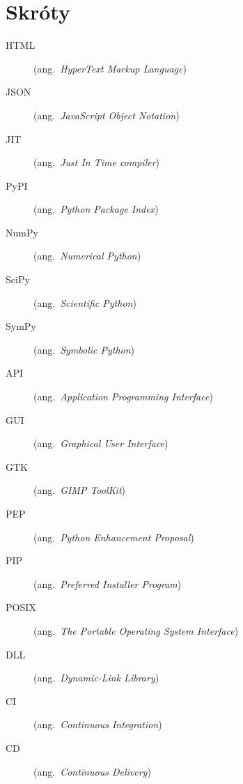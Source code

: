 \chapter*{Skróty}\mbox{}
\label{sec:skroty}
\noindent
\begin{description}
  \item [HTML]    (ang.\ \emph{HyperText Markup Language})
  \item [JSON]    (ang.\ \emph{JavaScript Object Notation})
  \item [JIT]     (ang.\ \emph{Just In Time compiler})
  \item [PyPI]    (ang.\ \emph{Python Package Index})
  \item [NumPy]   (ang.\ \emph{Numerical Python})
  \item [SciPy]   (ang.\ \emph{Scientific Python})
  \item [SymPy]   (ang.\ \emph{Symbolic Python})
  \item [API]     (ang.\ \emph{Application Programming Interface})
  \item [GUI]     (ang.\ \emph{Graphical User Interface})
  \item [GTK]     (ang.\ \emph{GIMP ToolKit})
  \item [PEP]     (ang.\ \emph{Python Enhancement Proposal})
  \item [PIP]     (ang.\ \emph{Preferred Installer Program})
  \item [POSIX]   (ang.\ \emph{The Portable Operating System Interface})
  \item [DLL]     (ang.\ \emph{Dynamic-Link Library})
  \item [CI]      (ang.\ \emph{Continuous Integration})
  \item [CD]      (ang.\ \emph{Continuous Delivery})
\end{description}
